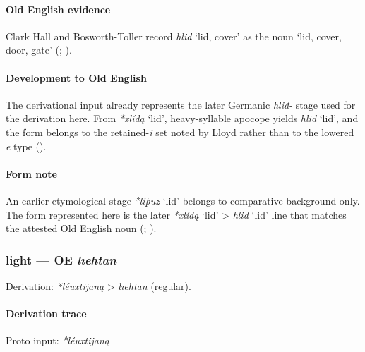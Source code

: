 \documentclass[
  british,
  a4paper,
]{article}
\providecommand{\Recon}[1]{\emph{*#1}}
\begin{document}
\paragraph{Old English evidence}\label{old-english-evidence-38}

Clark Hall and Bosworth-Toller record {\emph{hlid}} `lid, cover' as the
noun `lid, cover, door, gate' (; ).

\paragraph{Development to Old
English}\label{development-to-old-english-38}

The derivational input already represents the later Germanic
\emph{hliđ-} stage used for the derivation here. From \Recon{xlídą}
`lid', heavy-syllable apocope yields \emph{hlid} `lid', and the form
belongs to the retained-\emph{i} set noted by Lloyd rather than to the
lowered \emph{e} type ().

\paragraph{Form note}\label{form-note-11}

An earlier etymological stage \Recon{liþuz} `lid' belongs to comparative
background only. The form represented here is the later \Recon{xlídą}
`lid' \textgreater{} \emph{hlid} `lid' line that matches the attested
Old English noun (;
).

\subsubsection{\texorpdfstring{light --- OE
\emph{līehtan}}{light --- OE līehtan}}\label{light-oe-lux12behtan}

Derivation: \emph{*léuxtijaną} \textgreater{} \emph{līehtan} (regular).

\paragraph{Derivation trace}\label{derivation-trace-43}

Proto input: \emph{*léuxtijaną}

\begingroup
\setlength{\fboxsep}{6pt}
\end{document}
